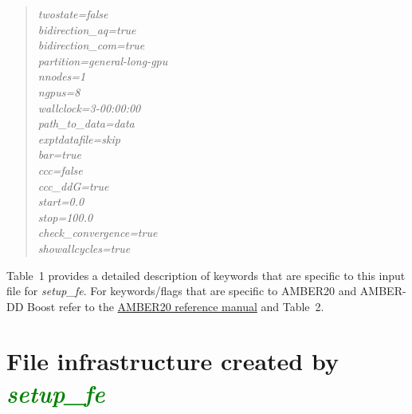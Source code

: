 \documentclass[11pt,letterpaper,titlepage]{article}
\newenvironment{itquote}
  {\begin{quote}\itshape}
  {\end{quote}\ignorespacesafterend}
\begin{document}
\begin{itquote}
{twostate=false 					\\
bidirection\_aq=true 				\\
bidirection\_com=true 				\\

partition=general-long-gpu       		\\
nnodes=1                        		\\
ngpus=8                        			\\
wallclock=3-00:00:00          			\\

path\_to\_data=data 				\\
exptdatafile=skip 				\\
bar=true 					\\
ccc=false 					\\
ccc\_ddG=true 					\\
start=0.0 					\\
stop=100.0 					\\
check\_convergence=true 			\\
showallcycles=true 				\\

}

\end{itquote}

Table~1 provides a detailed description of keywords that are specific to this input file for 
\textit{setup\_fe}. 
For keywords/flags that are specific to AMBER20 and AMBER-DD Boost refer to the 
\href{https://ambermd.org/doc12/Amber20.pdf}{AMBER20 reference manual}
and Table~2.

\vspace{0.1cm}
\section{File infrastructure created by \textcolor{green}{\textit{setup\_fe}}}
\vspace{0.1cm}
\end{document}
